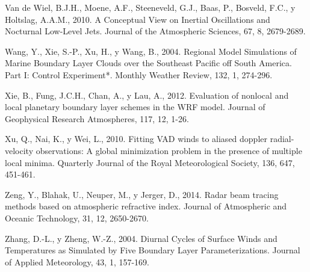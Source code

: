 \documentclass[12pt,spanish,oneside, a4paper]{book}
\begin{document}
\hypertarget{ref-VanDeWiel2010}{}
Van de Wiel, B.J.H., Moene, A.F., Steeneveld, G.J., Baas, P., Bosveld,
F.C., y Holtslag, A.A.M., 2010. A Conceptual View on Inertial
Oscillations and Nocturnal Low-Level Jets. Journal of the Atmospheric
Sciences, 67, 8, 2679-2689.

\hypertarget{ref-Wang2004}{}
Wang, Y., Xie, S.-P., Xu, H., y Wang, B., 2004. Regional Model
Simulations of Marine Boundary Layer Clouds over the Southeast Pacific
off South America. Part I: Control Experiment*. Monthly Weather Review,
132, 1, 274-296.

\hypertarget{ref-Xie2012}{}
Xie, B., Fung, J.C.H., Chan, A., y Lau, A., 2012. Evaluation of nonlocal
and local planetary boundary layer schemes in the WRF model. Journal of
Geophysical Research Atmospheres, 117, 12, 1-26.

\hypertarget{ref-Xu2010}{}
Xu, Q., Nai, K., y Wei, L., 2010. Fitting VAD winds to aliased doppler
radial-velocity observations: A global minimization problem in the
presence of multiple local minima. Quarterly Journal of the Royal
Meteorological Society, 136, 647, 451-461.

\hypertarget{ref-Zeng2014}{}
Zeng, Y., Blahak, U., Neuper, M., y Jerger, D., 2014. Radar beam tracing
methods based on atmospheric refractive index. Journal of Atmospheric
and Oceanic Technology, 31, 12, 2650-2670.

\hypertarget{ref-Zhang2004}{}
Zhang, D.-L., y Zheng, W.-Z., 2004. Diurnal Cycles of Surface Winds and
Temperatures as Simulated by Five Boundary Layer Parameterizations.
Journal of Applied Meteorology, 43, 1, 157-169.
\end{document}
